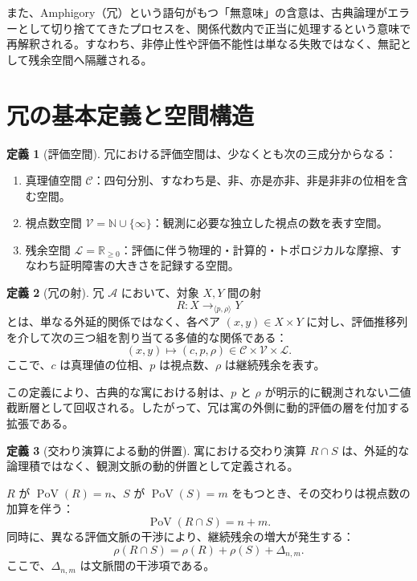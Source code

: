 \documentclass[a4paper,11pt]{article}
\newcommand{\PoV}{\operatorname{PoV}}
\theoremstyle{definition}
\newtheorem{definition}{定義}[section]
\begin{document}
また、Amphigory（冗）という語句がもつ「無意味」の含意は、古典論理がエラーとして切り捨ててきたプロセスを、関係代数内で正当に処理するという意味で再解釈される。すなわち、非停止性や評価不能性は単なる失敗ではなく、無記として残余空間へ隔離される。

\section{冗の基本定義と空間構造}

\begin{definition}[評価空間]
冗における評価空間は、少なくとも次の三成分からなる：
\begin{enumerate}
\item 真理値空間 $\mathcal{C}$：四句分別、すなわち是、非、亦是亦非、非是非非の位相を含む空間。
\item 視点数空間 $\mathcal{V} = \mathbb{N} \cup \{\infty\}$：観測に必要な独立した視点の数を表す空間。
\item 残余空間 $\mathcal{L} = \mathbb{R}_{\ge 0}$：評価に伴う物理的・計算的・トポロジカルな摩擦、すなわち証明障害の大きさを記録する空間。
\end{enumerate}
\end{definition}

\begin{definition}[冗の射]
冗 $\mathcal{A}$ において、対象 $X,Y$ 間の射
\[
R: X \to_{\langle p,\rho\rangle} Y
\]
とは、単なる外延的関係ではなく、各ペア $(x,y) \in X \times Y$ に対し、評価推移列を介して次の三つ組を割り当てる多値的な関係である：
\[
(x,y) \longmapsto (c,p,\rho) \in \mathcal{C} \times \mathcal{V} \times \mathcal{L}.
\]
ここで、$c$ は真理値の位相、$p$ は視点数、$\rho$ は継続残余を表す。
\end{definition}

この定義により、古典的な寓における射は、$p$ と $\rho$ が明示的に観測されない二値截断層として回収される。したがって、冗は寓の外側に動的評価の層を付加する拡張である。

\begin{definition}[交わり演算による動的併置]
寓における交わり演算 $R \cap S$ は、外延的な論理積ではなく、観測文脈の動的併置として定義される。

$R$ が $\PoV(R)=n$、$S$ が $\PoV(S)=m$ をもつとき、その交わりは視点数の加算を伴う：
\[
\PoV(R \cap S) = n + m.
\]
同時に、異なる評価文脈の干渉により、継続残余の増大が発生する：
\[
\rho(R \cap S) = \rho(R) + \rho(S) + \Delta_{n,m}.
\]
ここで、$\Delta_{n,m}$ は文脈間の干渉項である。
\end{definition}
\end{document}
